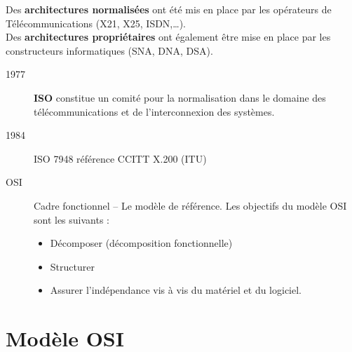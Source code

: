 \documentclass[12pt,a4paper,openany]{book}
\begin{document}
		Des \textbf{architectures normalisées} ont été mis en place par les opérateurs de Télécommunications (X21, X25, ISDN,\ldots).\\
		Des \textbf{architectures propriétaires} ont également être mise en place par les constructeurs informatiques (SNA, DNA, DSA).\\
		\begin{description}
			\item[1977] \textbf{ISO} constitue un comité pour la normalisation dans le domaine des télécommunications et de l'interconnexion des systèmes.\\
			\item[1984] ISO 7948 référence CCITT X.200 (ITU)
			\item[OSI] Cadre fonctionnel -- Le modèle de référence. Les objectifs du modèle OSI sont les suivants : 
				\begin{itemize}
					\item Décomposer (décomposition fonctionnelle)
					\item Structurer
					\item Assurer l'indépendance vis à vis du matériel et du logiciel.
				\end{itemize}
		\end{description}
	\chapter{Modèle OSI}
\end{document}
